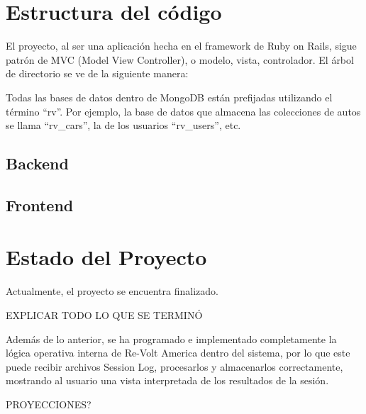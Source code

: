 \section{Estructura del código}
El proyecto, al ser una aplicación hecha en el framework de Ruby on Rails, sigue patrón de MVC (Model View Controller), o modelo, vista, controlador. El árbol de directorio se ve de la siguiente manera:


Todas las bases de datos dentro de MongoDB están prefijadas utilizando el término “rv”. Por ejemplo, la base de datos que almacena las colecciones de autos se llama “rv\_cars”, la de los usuarios “rv\_users”, etc.

\subsection{Backend}


\subsection{Frontend}


\section{Estado del Proyecto}
Actualmente, el proyecto se encuentra finalizado.

EXPLICAR TODO LO QUE SE TERMINÓ

Además de lo anterior, se ha programado e implementado completamente la lógica operativa interna de Re-Volt America dentro del sistema, por lo que este puede recibir archivos Session Log, procesarlos y almacenarlos correctamente, mostrando al usuario una vista interpretada de los resultados de la sesión.

PROYECCIONES?



